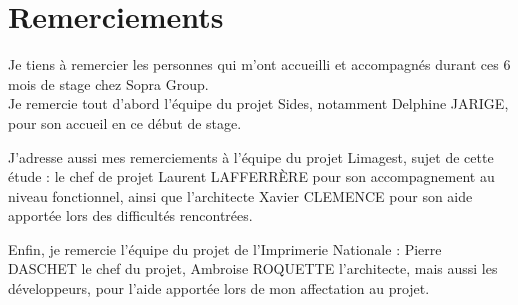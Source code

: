 \cleardoublepage

\chapter*{Remerciements}

\thispagestyle{empty}



Je tiens à remercier les personnes qui m'ont accueilli et accompagnés durant ces 6 mois de stage chez Sopra Group.
\\

Je remercie tout d'abord l'équipe du projet Sides, notamment Delphine JARIGE, pour son accueil en ce début de stage.

J'adresse aussi mes remerciements à l'équipe du projet Limagest, sujet de cette étude : le chef de projet Laurent LAFFERRÈRE pour son accompagnement au niveau fonctionnel, ainsi que l'architecte Xavier CLEMENCE pour son aide apportée lors des difficultés rencontrées.

Enfin, je remercie l'équipe du projet de l'Imprimerie Nationale : Pierre DASCHET le chef du projet, Ambroise ROQUETTE l'architecte, mais aussi les développeurs, pour l'aide apportée lors de mon affectation au projet.